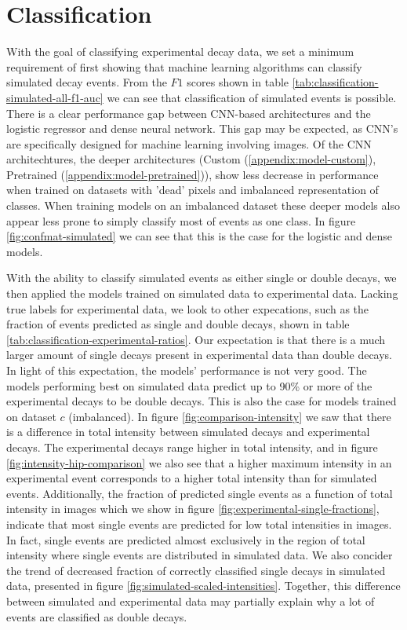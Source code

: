\section{Classification}
With the goal of classifying experimental decay data, we set a minimum requirement
of first showing that machine learning algorithms can classify simulated decay events.
From the $F1$ scores shown in table \ref{tab:classification-simulated-all-f1-auc} we
can see that classification of simulated events is possible.
There is a clear performance gap between CNN-based architectures and the logistic regressor and dense
neural network. This gap may be expected, as CNN's are specifically designed for
machine learning involving images. Of the CNN architechtures, the deeper architectures
(Custom (\ref{appendix:model-custom}), Pretrained (\ref{appendix:model-pretrained})),
show less decrease in performance when trained on datasets with 'dead' pixels and
imbalanced representation of classes. When training models on an imbalanced dataset
these deeper models also appear less prone to simply classify most of events as one
class. In figure \ref{fig:confmat-simulated} we can see that this is the case for
the logistic and dense models.

\noindent With the ability to classify simulated events as either single or double decays,
we then applied the models trained on simulated data to experimental data.
Lacking true labels for experimental data, we look to other expecations, such
as the fraction of events predicted as single and double decays, shown in table
\ref{tab:classification-experimental-ratios}. Our expectation is that there is
a much larger amount of single decays present in experimental data than
double decays. In light of this expectation, the models' performance is not very good.
The models performing best on simulated data predict up to 90\% or more of the
experimental decays to be double decays. This is also the case for models trained
on dataset $c$ (imbalanced). In figure \ref{fig:comparison-intensity} we saw that
there is a difference in total intensity between simulated decays and experimental
decays. The experimental decays range higher in total intensity, and in figure
\ref{fig:intensity-hip-comparison} we also see that a higher maximum intensity in
an experimental event corresponds to a higher total intensity than for simulated
events. Additionally, the fraction of predicted single events as a function of total
intensity in images which we show in figure \ref{fig:experimental-single-fractions},
indicate that most single events are predicted for low total intensities in images.
In fact, single events are predicted almost exclusively in the region of total intensity
where single events are distributed in simulated data. We also concider the trend
of decreased fraction of correctly classified single decays in simulated data,
presented in figure \ref{fig:simulated-scaled-intensities}. Together,
this difference between simulated and experimental data may partially explain why a 
lot of events are classified as double decays. 

